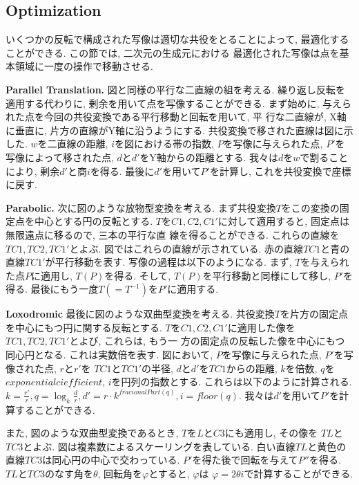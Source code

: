 \subsection{Optimization}

いくつかの反転で構成された写像は適切な共役をとることによって, 最適化する
ことができる.
この節では, 二次元の生成元における
最適化された写像は点を基本領域に一度の操作で移動させる.

\noindent\textbf{Parallel Translation.}
図と同様の平行な二直線の組を考える.
繰り返し反転を適用する代わりに, 剰余を用いて点を写像することができる.
まず始めに, 与えられた点を今回の共役変換である平行移動と回転を用いて, 平
行な二直線が, X軸に垂直に, 片方の直線がY軸に沿うようにする.
共役変換で移された直線は図に示した.
$w$を二直線の距離, $i$を図における帯の指数, $P$を写像に与えられた点,
$P'$を写像によって移された点, $d$と$d'$をY軸からの距離とする.
我々は$d$を$w$で割ることにより, 剰余$d'$と商$i$を得る.
最後に$d'$を用いて$P'$を計算し, これを共役変換で座標に戻す.

\noindent\textbf{Parabolic.}
次に図のような放物型変換を考える.
まず共役変換$T$をこの変換の固定点を中心とする円の反転とする.
$T$を$C1,C2,C1'$に対して適用すると, 固定点は無限遠点に移るので, 三本の平行な直
線を得ることができる.
これらの直線を$TC1, TC2, TC1'$とよぶ.
図ではこれらの直線が示されている.
赤の直線$TC1$と青の直線$TC1'$が平行移動を表す.
写像の過程は以下のようになる.
まず, $T$を与えられた点$P$に適用し, $T(P)$を得る.
そして, $T(P)$を平行移動と同様にして移し, $P'$を得る.
最後にもう一度$T(= T^{-1})$を$P'$に適用する.

\noindent\textbf{Loxodromic}
最後に図のような双曲型変換を考える.
共役変換$T$を片方の固定点を中心にもつ円に関する反転とする.
$T$を$C1, C2, C1'$に適用した像を$TC1, TC2, TC1'$とよび, これらは, もう一
方の固定点の反転した像を中心にもつ同心円となる.
これは実数倍を表す.
図において, $P$を写像に与えられた点, $P'$を写像された点, $r$と$r'$を
$TC1$と$TC1'$の半径, $d$と$d'$を$TC1$からの距離, $k$を倍数, $q$を
$exponential ciefficient$,  $i$を円列の指数とする.
これらは以下のように計算される.
 \begin{math}
  k = \frac{r'}{r},
  q = \log_{k} \frac{d}{r},
  d' = r \cdot k^{fracionalPart(q)},
  i = floor(q).
 \end{math}
我々は$d'$を用いて$P'$を計算することができる.

また, 図のような双曲型変換であるとき, $T$を$L$と$C3$にも適用し, その像を
$TL$と$TC3$とよぶ.
図は複素数によるスケーリングを表している.
白い直線$TL$と黄色の直線$TC3$は同心円の中心で交わっている.
$P'$を得た後で回転を与えて$P''$を得る.
$TL$と$TC3$のなす角を$\theta$, 回転角を$\varphi$とすると, $\varphi$は
$\varphi = 2 \theta i$で計算することができる.

